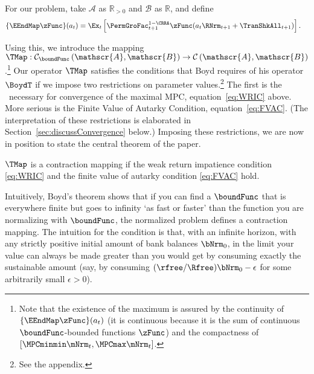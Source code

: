\documentclass[BufferStockTheory]{subfiles}
\begin{document}
For our problem, take $\mathscr{A}$ as $\mathbb{R}_{>0}$ and $\mathscr{B}$
as $\mathbb{R}$, and define
\begin{align*}
  \{\EEndMap \zFunc\}(a_{t})  & = \Ex_{t}\left[\PermGroFac^{1-\CRRA}_{t+1} \zFunc(a_{t} \RNrm_{t+1} + \TranShkAll_{t+1})\right].
\end{align*}

Using this, we introduce the mapping \textit{$\TMap:\mathcal{C}_{\boundFunc }\left( \mathscr{A},\mathscr{B}\right) \rightarrow \mathcal{C}\left( \mathscr{A},\mathscr{B}\right) $}.\footnote{Note that the existence of the maximum is assured by the continuity of $\{\EEndMap \zFunc\}(a_{t})$ (it is continuous because it is the sum of continuous $\boundFunc$-bounded functions $\zFunc$) and the compactness of $[\MPCminmin \mNrm_{t}, \MPCmax \mNrm_{t}]$.}\hypertarget{Contraction-Conditions}{}
Our operator $\TMap$ satisfies the conditions that Boyd requires of his operator $\BoydT$ if we impose two restrictions on parameter values.\footnote{See the appendix.}  The first is the \WRIC~necessary for convergence of the maximal MPC, equation~\eqref{eq:WRIC} above.  More serious is the Finite Value of Autarky Condition, equation~\eqref{eq:FVAC}.  (The interpretation of these restrictions is elaborated in Section~\ref{sec:discussConvergence} below.)  Imposing these restrictions, we are now in position to state the central theorem of the paper.

\hypertarget{MainTheorem}{}
\setcounter{theorem}{0}
\begin{theorem}\label{thm:contmap}
  $\TMap$ is a contraction mapping if the weak return impatience condition \eqref{eq:WRIC} and the finite value of autarky condition \eqref{eq:FVAC} hold.
\end{theorem}

Intuitively, Boyd's theorem shows that if you can find a $\boundFunc$ that is everywhere finite but goes to infinity `as fast or faster' than the function you are normalizing with $\boundFunc$, the normalized problem defines a contraction mapping.  The intuition for the {\FVAC} condition is that, with an infinite horizon, with any strictly positive initial amount of bank balances $\bNrm_{0}$, in the limit your value can always be made greater than you would get by consuming exactly the sustainable amount (say, by consuming $(\rfree/\Rfree)\bNrm_{0}-\epsilon$ for some arbitrarily small $\epsilon>0$).
\end{document}
